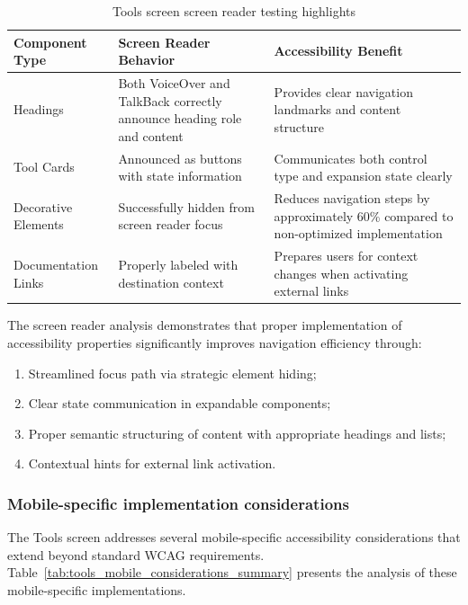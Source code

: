 \begin{table}[ht]
\caption{Tools screen screen reader testing highlights}
\label{tab:tools_screen_reader_support_summary}
\centering
\begin{tabular}[c]{|C{3.8cm}|C{3.8cm}|C{5.8cm}|}
\hline
\textbf{Component Type} & \textbf{Screen Reader Behavior} & \textbf{Accessibility Benefit} \\
\hline
Headings & Both VoiceOver and TalkBack correctly announce heading role and content & Provides clear navigation landmarks and content structure \\
\hline
Tool Cards & Announced as buttons with state information & Communicates both control type and expansion state clearly \\
\hline
Decorative Elements & Successfully hidden from screen reader focus & Reduces navigation steps by approximately 60\% compared to non-optimized implementation \\
\hline
Documentation Links & Properly labeled with destination context & Prepares users for context changes when activating external links \\
\hline
\end{tabular}
\end{table}
\FloatBarrier

The screen reader analysis demonstrates that proper implementation of accessibility properties significantly improves navigation efficiency through:

\begin{enumerate}
    \item Streamlined focus path via strategic element hiding;
    
    \item Clear state communication in expandable components;
    
    \item Proper semantic structuring of content with appropriate headings and lists;
    
    \item Contextual hints for external link activation.
\end{enumerate}

\subsubsection{Mobile-specific implementation considerations}
\label{subsubsec:tools-mobile-specific-summary}

The Tools screen addresses several mobile-specific accessibility considerations that extend beyond standard WCAG requirements. Table~\ref{tab:tools_mobile_considerations_summary} presents the analysis of these mobile-specific implementations.


